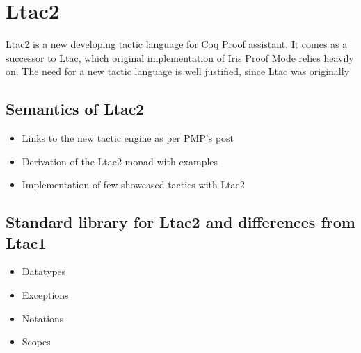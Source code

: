 \chapter{Ltac2}

Ltac2 is a new developing tactic language for Coq Proof assistant.
It comes as a successor to Ltac, which original implementation of Iris Proof Mode relies heavily on.
The need for a new tactic language is well justified, since Ltac was originally 


\section{Semantics of Ltac2}

\begin{itemize}
  \item Links to the new tactic engine as per PMP's post
  \item Derivation of the Ltac2 monad with examples
  \item Implementation of few showcased tactics with Ltac2
\end{itemize}

\section{Standard library for Ltac2 and differences from Ltac1}

\begin{itemize}
  \item Datatypes
  \item Exceptions
  \item Notations
  \item Scopes
\end{itemize}


